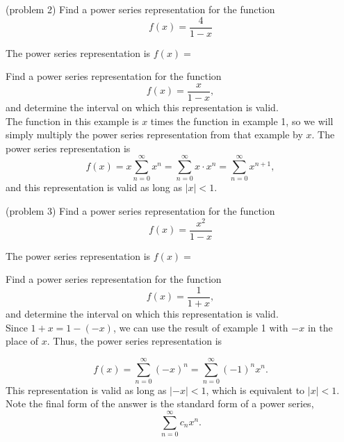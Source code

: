 \documentclass{ximera}
\begin{document}
\begin{problem}(problem 2)
Find a power series representation for the function
\[
f(x) = \frac{4}{1-x}
\]

The power series representation is $f(x) = $
\begin{multipleChoice}
\end{multipleChoice}
\end{problem}


\begin{example}[example 3]
Find a power series representation for the function
\[
f(x) = \frac{x}{1-x},
\]
and determine the interval on which this representation is valid.\\
The function in this example is $x$ times the function in example 1, 
so we will simply multiply the power series representation from that example by $x$.
The power series representation is
\[
f(x) = x\sum_{n=0}^\infty x^n  = \sum_{n=0}^\infty x\cdot x^n = \sum_{n=0}^\infty x^{n+1},
\]
and this representation is valid as long as $|x| < 1$.

\end{example}


\begin{problem}(problem 3)
Find a power series representation for the function
\[
f(x) = \frac{x^2}{1-x}
\]

The power series representation is $f(x) = $
\begin{multipleChoice}
\end{multipleChoice}
\end{problem}


\begin{example}[example 4]
Find a power series representation for the function
\[
f(x) = \frac{1}{1 + x},
\]
and determine the interval on which this representation is valid.\\
Since $1 + x = 1 - (-x)$, we can use the result of example 1 with $-x$ in the place of $x$.
Thus, the power series representation is

\[
f(x) = \sum_{n=0}^\infty (-x)^n = \sum_{n=0}^\infty (-1)^n x^n.
\]
This representation is valid as long as $|-x| < 1$, which is equivalent to $|x| < 1$.
Note the final form of the answer is the standard form of a power series,
\[
\sum_{n=0}^\infty c_nx^n.
\]

\end{example}
\end{document}
